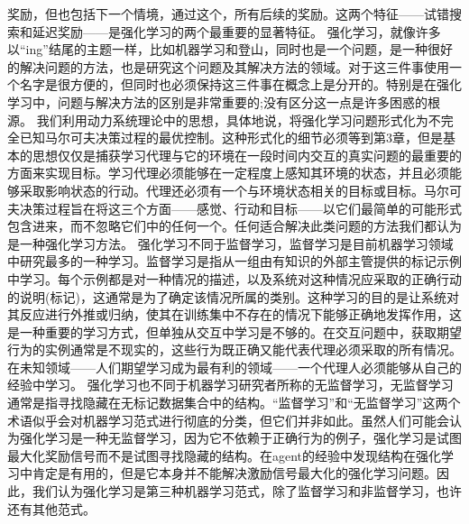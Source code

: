 奖励，但也包括下一个情境，通过这个，所有后续的奖励。这两个特征——试错搜索和延迟奖励——是强化学习的两个最重要的显著特征。
强化学习，就像许多以“ing”结尾的主题一样，比如机器学习和登山，同时也是一个问题，是一种很好的解决问题的方法，也是研究这个问题及其解决方法的领域。对于这三件事使用一个名字是很方便的，但同时也必须保持这三件事在概念上是分开的。特别是在强化学习中，问题与解决方法的区别是非常重要的;没有区分这一点是许多困惑的根源。
我们利用动力系统理论中的思想，具体地说，将强化学习问题形式化为不完全已知马尔可夫决策过程的最优控制。这种形式化的细节必须等到第3章，但是基本的思想仅仅是捕获学习代理与它的环境在一段时间内交互的真实问题的最重要的方面来实现目标。学习代理必须能够在一定程度上感知其环境的状态，并且必须能够采取影响状态的行动。代理还必须有一个与环境状态相关的目标或目标。马尔可夫决策过程旨在将这三个方面——感觉、行动和目标——以它们最简单的可能形式包含进来，而不忽略它们中的任何一个。任何适合解决此类问题的方法我们都认为是一种强化学习方法。
强化学习不同于监督学习，监督学习是目前机器学习领域中研究最多的一种学习。监督学习是指从一组由有知识的外部主管提供的标记示例中学习。每个示例都是对一种情况的描述，以及系统对这种情况应采取的正确行动的说明(标记)，这通常是为了确定该情况所属的类别。这种学习的目的是让系统对其反应进行外推或归纳，使其在训练集中不存在的情况下能够正确地发挥作用，这是一种重要的学习方式，但单独从交互中学习是不够的。在交互问题中，获取期望行为的实例通常是不现实的，这些行为既正确又能代表代理必须采取的所有情况。在未知领域——人们期望学习成为最有利的领域——一个代理人必须能够从自己的经验中学习。
强化学习也不同于机器学习研究者所称的无监督学习，无监督学习通常是指寻找隐藏在无标记数据集合中的结构。“监督学习”和“无监督学习”这两个术语似乎会对机器学习范式进行彻底的分类，但它们并非如此。虽然人们可能会认为强化学习是一种无监督学习，因为它不依赖于正确行为的例子，强化学习是试图最大化奖励信号而不是试图寻找隐藏的结构。在agent的经验中发现结构在强化学习中肯定是有用的，但是它本身并不能解决激励信号最大化的强化学习问题。因此，我们认为强化学习是第三种机器学习范式，除了监督学习和非监督学习，也许还有其他范式。

